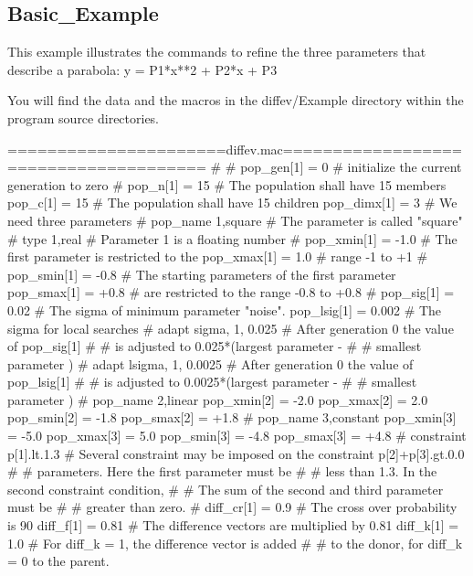 \subsection*{Basic\_Example}
\par
This example illustrates the commands to refine the three parameters 
that describe a parabola: y = P1*x**2 + P2*x + P3 
\par
You will find the data and the macros in the diffev/Example directory 
within the program source directories. 
\begin{MacVerbatim}
======================diffev.mac======================================
#
#
pop_gen[1]  = 0         # initialize the current generation to zero
#
pop_n[1]    = 15        # The population shall have 15 members
pop_c[1]    = 15        # The population shall have 15 children
pop_dimx[1] = 3         # We need three parameters
#
pop_name      1,square  # The parameter is called "square"
#
type          1,real    # Parameter 1 is a floating number
#
pop_xmin[1] = -1.0      # The first parameter is restricted to the
pop_xmax[1] =  1.0      # range -1 to +1
#
pop_smin[1] = -0.8      # The starting parameters of the first parameter
pop_smax[1] = +0.8      # are restricted to the range -0.8 to +0.8
#
pop_sig[1]  =  0.02     # The sigma of minimum parameter "noise".
pop_lsig[1] =  0.002    # The sigma for local searches
#
adapt  sigma, 1, 0.025  # After generation 0 the value of pop_sig[1]
#                       # is adjusted to 0.025*(largest parameter -
#                       #                       smallest parameter )
#
adapt lsigma, 1, 0.0025 # After generation 0 the value of pop_lsig[1]
#                       # is adjusted to 0.0025*(largest parameter -
#                       #                        smallest parameter )
#
pop_name      2,linear
pop_xmin[2] = -2.0
pop_xmax[2] =  2.0
pop_smin[2] = -1.8
pop_smax[2] = +1.8
#
pop_name      3,constant
pop_xmin[3] = -5.0
pop_xmax[3] =  5.0
pop_smin[3] = -4.8
pop_smax[3] = +4.8
#
constraint  p[1].lt.1.3 # Several constraint may be imposed on the
constraint  p[2]+p[3].gt.0.0
#                       # parameters. Here the first parameter must be
#                       # less than 1.3. In the second constraint condition,
#                       # The sum of the second and third parameter must be
#                       # greater than zero.
#
diff_cr[1]  = 0.9       # The cross over probability is 90%
diff_f[1]   = 0.81      # The difference vectors are multiplied by 0.81
diff_k[1]   = 1.0       # For diff_k = 1, the difference vector is added
#                       # to the donor, for diff_k = 0 to the parent.

\end{MacVerbatim}
